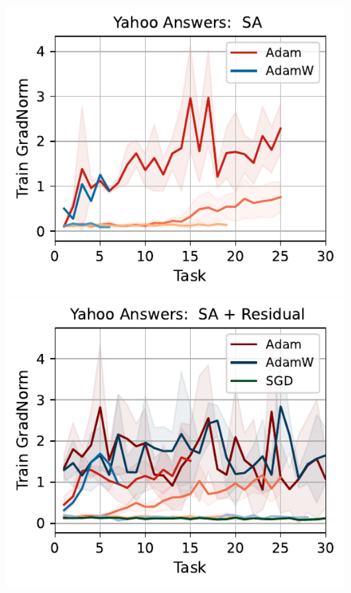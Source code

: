 \begin{figure}[htb!]
{        \includegraphics[width=\textwidth]{figs/GradNorm/nlp/attention/yahoo_answers_40.pdf}
        \includegraphics[width=\textwidth]{figs/GradNorm/nlp/attention_residual/yahoo_answers_40.pdf}
}
\end{figure}
